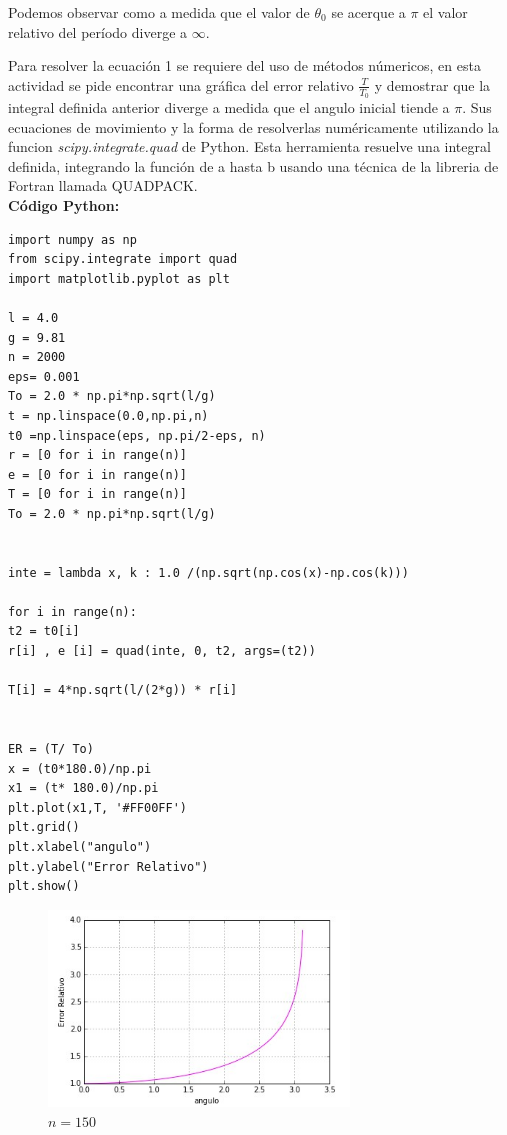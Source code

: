 \documentclass[12pt]{article}
\begin{document}
Podemos observar como a medida que el valor de $\theta_0$ se acerque a $\pi$ el valor relativo del período diverge a $\infty$.

Para resolver la ecuación 1 se requiere del uso de métodos númericos, en esta actividad se pide encontrar una gráfica del error relativo $\frac{T}{T_0}$ y demostrar que la integral definida anterior diverge a medida que el angulo inicial tiende a $\pi$.
Sus ecuaciones de movimiento y la forma de resolverlas numéricamente utilizando la funcion \textit{scipy.integrate.quad} de Python.
Esta herramienta resuelve una integral definida, integrando la función de a hasta b usando una técnica de la libreria de Fortran llamada \textsc{QUADPACK}.\\

\textbf{Código Python:}


\begin{verbatim}
import numpy as np
from scipy.integrate import quad
import matplotlib.pyplot as plt

l = 4.0     
g = 9.81 
n = 2000
eps= 0.001
To = 2.0 * np.pi*np.sqrt(l/g)
t = np.linspace(0.0,np.pi,n)
t0 =np.linspace(eps, np.pi/2-eps, n)
r = [0 for i in range(n)]
e = [0 for i in range(n)]
T = [0 for i in range(n)]
To = 2.0 * np.pi*np.sqrt(l/g)


inte = lambda x, k : 1.0 /(np.sqrt(np.cos(x)-np.cos(k)))

for i in range(n):
t2 = t0[i]
r[i] , e [i] = quad(inte, 0, t2, args=(t2))

T[i] = 4*np.sqrt(l/(2*g)) * r[i]


ER = (T/ To)
x = (t0*180.0)/np.pi 
x1 = (t* 180.0)/np.pi
plt.plot(x1,T, '#FF00FF')
plt.grid()
plt.xlabel("angulo")
plt.ylabel("Error Relativo")
plt.show()

\end{verbatim}


\begin{figure}[H]
	\centering
\includegraphics[width=8cm]{150.jpg}	
\caption{$n=150$}
\end{figure}
\end{document}
